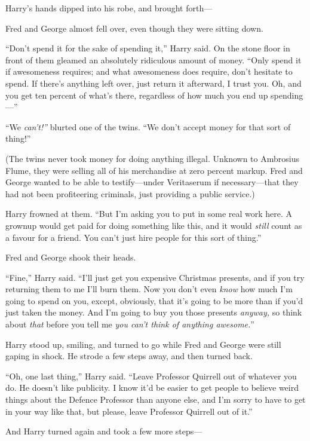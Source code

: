 Harry's hands dipped into his robe, and brought forth---

Fred and George almost fell over, even though they were sitting down.

``Don't spend it for the sake of spending it,'' Harry said. On the stone
floor in front of them gleamed an absolutely ridiculous amount of money.
``Only spend it if awesomeness requires; and what awesomeness does
require, don't hesitate to spend. If there's anything left over, just
return it afterward, I trust you. Oh, and you get ten percent of what's
there, regardless of how much you end up spending---''

``We \emph{can't!''} blurted one of the twins. ``We don't accept money
for that sort of thing!''

(The twins never took money for doing anything illegal. Unknown to
Ambrosius Flume, they were selling all of his merchandise at zero
percent markup. Fred and George wanted to be able to testify---under
Veritaserum if necessary---that they had not been profiteering
criminals, just providing a public service.)

Harry frowned at them. ``But I'm asking you to put in some real work
here. A grownup would get paid for doing something like this, and it
would \emph{still} count as a favour for a friend. You can't just hire
people for this sort of thing.''

Fred and George shook their heads.

``Fine,'' Harry said. ``I'll just get you expensive Christmas presents,
and if you try returning them to me I'll burn them. Now you don't even
\emph{know} how much I'm going to spend on you, except, obviously, that
it's going to be more than if you'd just taken the money. And I'm going
to buy you those presents \emph{anyway,} so think about \emph{that}
before you tell me \emph{you can't think of anything awesome.}''

Harry stood up, smiling, and turned to go while Fred and George were
still gaping in shock. He strode a few steps away, and then turned back.

``Oh, one last thing,'' Harry said. ``Leave Professor Quirrell out of
whatever you do. He doesn't like publicity. I know it'd be easier to get
people to believe weird things about the Defence Professor than anyone
else, and I'm sorry to have to get in your way like that, but please,
leave Professor Quirrell out of it.''

And Harry turned again and took a few more steps---

